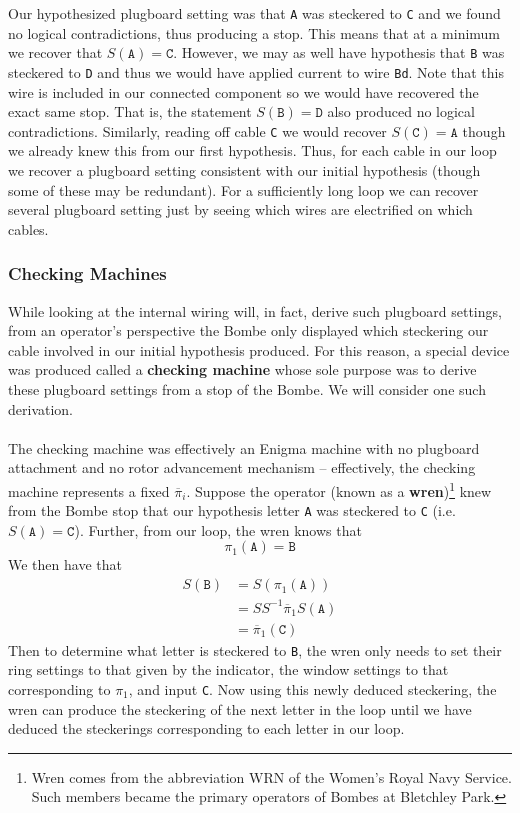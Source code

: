 Our hypothesized plugboard setting was that \texttt{A} was steckered
to \texttt{C} and we found no logical contradictions, thus producing a
stop. This means that at a minimum we recover that $S(\texttt{A}) =
\texttt{C}$. However, we may as well have hypothesis that \texttt{B}
was steckered to \texttt{D} and thus we would have applied current to
wire \texttt{Bd}. Note that this wire is included in our connected
component so we would have recovered the exact same stop. That is,
the statement $S(\texttt{B}) = \texttt{D}$ also produced no logical
contradictions. Similarly, reading off cable \texttt{C} we would
recover $S(\texttt{C}) = \texttt{A}$ though we already knew this from
our first hypothesis. Thus, for each cable in our loop we recover a
plugboard setting consistent with our initial hypothesis (though some
of these may be redundant). For a sufficiently long loop we can
recover several plugboard setting just by seeing which wires are
electrified on which cables.
\subsubsection{Checking Machines}
While looking at the internal wiring will, in fact, derive such
plugboard settings, from an operator's perspective the Bombe only
displayed which steckering our cable involved in our initial
hypothesis produced. For this reason, a special device was produced
called a {\bf{checking machine}} whose sole purpose was to derive
these plugboard settings from a stop of the Bombe. We will consider
one such derivation.
\\\\The checking machine was effectively an Enigma machine with no
plugboard attachment and no rotor advancement mechanism --
effectively, the checking machine represents a fixed
$\overline\pi_i$. Suppose the operator (known as a
{\bf{wren}})\footnote{Wren comes from the abbreviation WRN of the
  Women's Royal Navy Service. Such members became the primary operators
of Bombes at Bletchley Park.} knew from the Bombe stop that our
hypothesis letter \texttt{A} was steckered to \texttt{C} (i.e.\ $S(\texttt{A}) = \texttt{C}$). Further, from our loop, the wren knows that
\[
  \pi_1(\texttt{A}) = \texttt{B}
\]
We then have that
\begin{align*}
  S(\texttt{B}) & = S(\pi_1(\texttt{A}))                \\
  & = SS^{-1}\overline\pi_1 S(\texttt{A}) \\
  & = \overline\pi_1(\texttt{C})
\end{align*}
Then to determine what letter is steckered to \texttt{B}, the wren
only needs to set their ring settings to that given by the indicator,
the window settings to that corresponding to $\pi_1$, and input
\texttt{C}. Now using this newly deduced steckering, the wren can
produce the steckering of the next letter in the loop until we have
deduced the steckerings corresponding to each letter in our loop.

